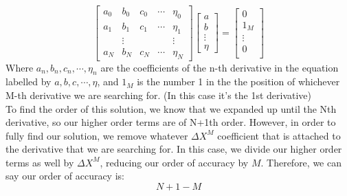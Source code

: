 \documentclass{article}
\begin{document}
\begin{enumerate}
\[\begin{bmatrix}
                a_0 & b_0 & c_0 & \cdots & \eta_0\\
                a_1 & b_1 & c_1 & \cdots & \eta_1\\
                 & \vdots &     &        & \vdots\\
                a_N & b_N & c_N & \cdots & \eta_N
        \end{bmatrix}
        \begin{bmatrix}
                a\\
                b\\
                \vdots\\
                \eta
        \end{bmatrix}
        =
        \begin{bmatrix}
                0\\
                1_M\\
                \vdots\\
                0\\
        \end{bmatrix}
    \]
    Where $a_n, b_n, c_n, \cdots, \eta_n$ are the coefficients of the n-th derivative in the equation labelled by $a, b, c, \cdots, \eta$, and $1_M$ is the number 1 in the the position of whichever M-th derivative we are searching for. (In this case it's the 1st derivative)
    \medskip\\
    To find the order of this solution, we know that we expanded up until the Nth derivative, so our higher order terms are of N+1th order. However, in order to fully find our solution, we remove whatever $\Delta X^M$ coefficient that is attached to the derivative that we are searching for. In this case, we divide our higher order terms as well by $\Delta X^M$, reducing our order of accuracy by $M$. Therefore, we can say our order of accuracy is:
    \[
        N + 1 - M
    \]
    

\end{enumerate}
\end{document}
